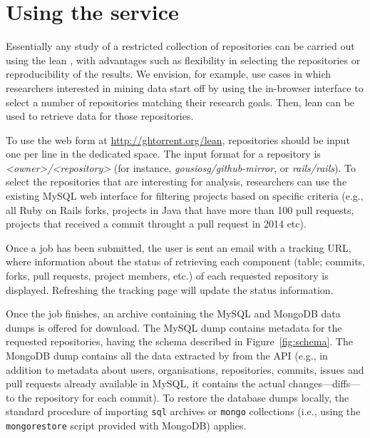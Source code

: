 
\section{Using the service}
\label{sec:usage}

Essentially any study of a restricted collection of \gh repositories can be carried out using the lean \ght, 
with advantages such as flexibility in selecting the repositories or reproducibility of the results.
%
We envision, for example, use cases in which researchers interested in mining \gh data start off by using the in-browser
interface to select a number of \gh repositories matching their research goals.
Then, lean \ght can be used to retrieve data for those repositories.

To use the web form at \url{http://ghtorrent.org/lean}, repositories should be input one per line in the dedicated space.
The input format for a repository is \emph{<owner>/<repository>} (for instance, \emph{gousiosg/github-mirror}, or \emph{rails/rails}). To select the repositories
that are interesting for analysis, researchers can use the existing \ght
MySQL web interface for filtering projects based on specific criteria (e.g.,
all Ruby on Rails forks, projects in Java that have more than 100 pull requests,
projects that received a commit throught a pull request in 2014 etc).

Once a job has been submitted, the user is sent an email with a tracking URL, where information about the status of retrieving
each component (table; commits, forks, pull requests, project members, etc.) of each requested repository is displayed.
Refreshing the tracking page will update the status information.
%
%
%
%
%
%
%
%
%
%

Once the job finishes, an archive containing the MySQL and MongoDB data dumps is offered for download.
The MySQL dump contains metadata for the requested repositories, having the schema described in Figure~\ref{fig:schema}.
The MongoDB dump contains all the data extracted by \ght from the \gh API (e.g., in addition to metadata about users,
organisations, repositories, commits, issues and pull requests already available in MySQL, it contains the actual 
changes---diffs---to the repository for each commit).
%
To restore the database dumps locally, the standard procedure of importing \texttt{sql} archives or \texttt{mongo} collections
(i.e., using the \texttt{mongorestore} script provided with MongoDB) applies.

